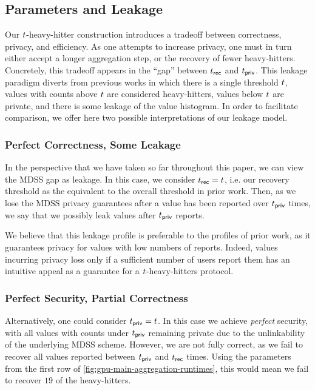 
\subsection{Parameters and Leakage}

Our $t$-heavy-hitter construction introduces a tradeoff between correctness, privacy, and efficiency.
As one attempts to increase privacy, one must in turn either accept a longer aggregation step, or the recovery of fewer heavy-hitters.
Concretely, this tradeoff appears in the ``gap'' between $t_{\sf rec}$ and $t_{\sf priv}$.
This leakage paradigm diverts from previous works in which there is a single threshold $t$, values with counts above $t$ are considered heavy-hitters, values below $t$ are private, and there is some leakage of the value histogram.
In order to facilitate comparison, we offer here two possible interpretations of our leakage model.

\subsubsection{Perfect Correctness, Some Leakage} In the perspective that we have taken so far throughout this paper, we can view the MDSS gap as leakage.
In this case, we consider $t_{\sf rec} = t$, i.e. our recovery threshold as the equivalent to the overall threshold in prior work.
Then, as we lose the MDSS privacy guarantees after a value has been reported over $t_{\sf priv}$ times, we say that we possibly leak values after $t_{\sf priv}$ reports.

We believe that this leakage profile is preferable to the profiles of prior work, as it guarantees privacy for values with low numbers of reports.
Indeed, values incurring privacy loss only if a sufficient number of users report them has an intuitive appeal as a guarantee for a $t$-heavy-hitters protocol.


\subsubsection{Perfect Security, Partial Correctness}
Alternatively, one could consider $t_{\sf priv} = t$.
In this case we achieve \emph{perfect} security, with all values with counts under $t_{\sf priv}$ remaining private due to the unlinkability of the underlying MDSS scheme.
However, we are not fully correct, as we fail to recover all values reported between $t_{\sf priv}$ and $t_{\sf rec}$ times.
Using the parameters from the first row of \cref{fig:gpu-main-aggregation-runtimes}, this would mean we fail to recover $19$ of the heavy-hitters.

